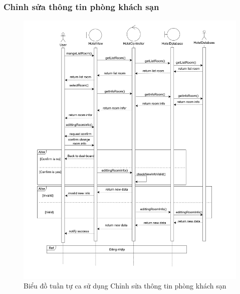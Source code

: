 \subsubsection{Chỉnh sửa thông tin phòng khách sạn}
\begin{figure}[H]
    \centering
    \includegraphics[width=\textwidth]{img2/chinhsuathongtinpt.png}
    \caption{Biểu đồ tuần tự ca sử dụng Chỉnh sửa thông tin phòng khách sạn}
\end{figure}


